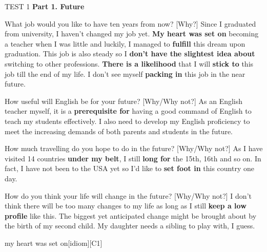 \begin{glossarymc}[Cambridge 14]
    \begin{test}{TEST 1}
    \noindent
    \textbf{Part 1. Future}
    \begin{qa}{What job would you like to have ten years from now? [Why?]}
    Since I graduated from university, I haven’t changed my job yet. \textbf{My heart was set on} becoming a teacher when I was little and luckily, I managed to \textbf{fulfill} this dream upon graduation. This job is also steady so I \textbf{don’t have the slightest idea about} switching to other professions. \textbf{There is a likelihood} that I will \textbf{stick to} this job till the end of my life. I don’t see myself \textbf{packing in} this job in the near future.
    \end{qa}

    \begin{qa}{How useful will English be for your future? [Why/Why not?]}
    As an English teacher myself, it is a \textbf{prerequisite for} having a good command of English to teach my students effectively. I also need to develop my English proficiency to meet the increasing demands of both parents and students in the future.
    \end{qa}

    \begin{qa}{How much travelling do you hope to do in the future? [Why/Why not?]}
    As I have visited 14 countries \textbf{under my belt}, I still \textbf{long for} the 15th, 16th and so on. In fact, I have not been to the USA yet so I’d like to \textbf{set foot in} this country one day.
    \end{qa}

    \begin{qa}{How do you think your life will change in the future? [Why/Why not?]}
    I don’t think there will be too many changes to my life as long as I still \textbf{keep a low profile} like this. The biggest yet anticipated change might be brought about by the birth of my second child. My daughter needs a sibling to play with, I guess.
    \end{qa}

        \begin{VocabExplain}[Part 1]
            \begin{ExplainCard}{my heart was set on}[idiom][C1]
            \end{ExplainCard}


\end{VocabExplain}
\end{test}
\end{glossarymc}
